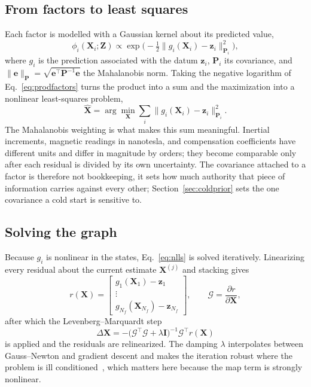 \documentclass{IEEEtaes}
\begin{document}
\subsection{From factors to least squares}
Each factor is modelled with a Gaussian kernel about its predicted value,
\begin{equation}
\phi_i(\mathbf{X}_i;\mathbf{Z})\propto
\exp\!\Big(-\tfrac{1}{2}\big\lVert g_i(\mathbf{X}_i)-\mathbf{z}_i\big\rVert^{2}_{\mathbf{P}_i}\Big),
\label{eq:kernel}
\end{equation}
where $g_i$ is the prediction associated with the datum $\mathbf{z}_i$,
$\mathbf{P}_i$ its covariance, and
$\lVert\mathbf{e}\rVert_{\mathbf{P}}=\sqrt{\mathbf{e}^{\top}\mathbf{P}^{-1}\mathbf{e}}$
the Mahalanobis norm. Taking the negative logarithm of Eq.~\eqref{eq:prodfactors}
turns the product into a sum and the maximization into a nonlinear least-squares
problem,
\begin{equation}
\hat{\mathbf{X}}=\arg\min_{\mathbf{X}}\sum_i
\big\lVert g_i(\mathbf{X}_i)-\mathbf{z}_i\big\rVert^{2}_{\mathbf{P}_i}.
\label{eq:nlls}
\end{equation}
The Mahalanobis weighting is what makes this sum meaningful. Inertial
increments, magnetic readings in nanotesla, and compensation coefficients have
different units and differ in magnitude by orders; they become comparable only
after each residual is divided by its own uncertainty. The covariance attached
to a factor is therefore not bookkeeping, it sets how much authority that piece
of information carries against every other; Section~\ref{sec:coldprior} sets the
one covariance a cold start is sensitive to.

\subsection{Solving the graph}
Because $g_i$ is nonlinear in the states, Eq.~\eqref{eq:nlls} is solved
iteratively. Linearizing every residual about the current estimate
$\mathbf{X}^{(j)}$ and stacking gives
\begin{equation}
r(\mathbf{X})=
\begin{bmatrix} g_1(\mathbf{X}_1)-\mathbf{z}_1\\ \vdots\\
g_{N_f}(\mathbf{X}_{N_f})-\mathbf{z}_{N_f}\end{bmatrix},
\qquad
\mathcal{G}=\frac{\partial r}{\partial\mathbf{X}},
\label{eq:resstack}
\end{equation}
after which the Levenberg--Marquardt step
\begin{equation}
\Delta\mathbf{X}=-\big(\mathcal{G}^{\top}\mathcal{G}+\lambda\mathbf{I}\big)^{-1}
\mathcal{G}^{\top}r(\mathbf{X})
\label{eq:lm}
\end{equation}
is applied and the residuals are relinearized. The damping $\lambda$ interpolates
between Gauss--Newton and gradient descent and makes the iteration robust where
the problem is ill conditioned~\cite{dellaert2006}, which matters here because
the map term is strongly nonlinear.
\end{document}
